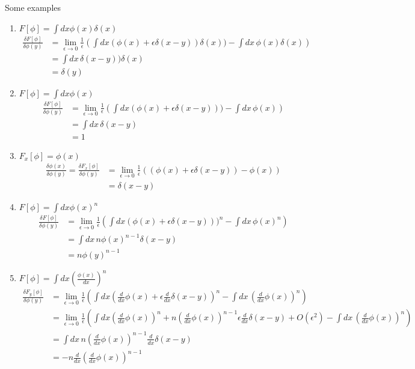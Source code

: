 \documentclass[10pt,a4paper]{book}
\theoremstyle{definition}
\begin{document}
Some examples
\begin{enumerate}
    \item $F[\phi]=\int dx \phi(x)\delta(x)$
    \begin{align}
        \frac{\delta F[\phi]}{\delta\phi(y)}
           &=\lim_{\epsilon\rightarrow0}\frac{1}{\epsilon}\left(\int dx(\phi(x)+\epsilon\delta(x-y))\delta(x))-\int
        dx\,\phi(x)\delta(x)\right)\\
        &=\int dx\,\delta(x-y))\delta(x)\\
       &=\delta(y)
    \end{align}
    \item $F[\phi]=\int dx \phi(x)$
    \begin{align}
        \frac{\delta F[\phi]}{\delta\phi(y)}
        &=\lim_{\epsilon\rightarrow0}\frac{1}{\epsilon}\left(\int dx(\phi(x)+\epsilon\delta(x-y)))-\int dx\,\phi(x)\right)\\
        &=\int dx\,\delta(x-y)\\
        &=1
    \end{align}
    \item $F_x[\phi]=\phi(x)$
    \begin{align}
        \frac{\delta \phi(x)}{\delta\phi(y)}=\frac{\delta F_x[\phi]}{\delta\phi(y)}
        &=\lim_{\epsilon\rightarrow0}\frac{1}{\epsilon}\left((\phi(x)+\epsilon\delta(x-y))-\phi(x)\right)\\
        &=\delta(x-y)
    \end{align}
    \item $F[\phi]=\int dx \phi(x)^n$
    \begin{align}
        \frac{\delta F[\phi]}{\delta\phi(y)}
        &=\lim_{\epsilon\rightarrow0}\frac{1}{\epsilon}\left(\int dx(\phi(x)+\epsilon\delta(x-y)))^n-\int dx\,\phi(x)^n\right)\\
        &=\int dx\,n\phi(x)^{n-1}\delta(x-y)\\
        &=n\phi(y)^{n-1}
    \end{align}
    \item $F[\phi]=\int dx \left(\frac{\phi(x)}{dx}\right)^n$
	\begin{align}
	\frac{\delta F_y[\phi]}{\delta\phi(y)}
	&=\lim_{\epsilon\rightarrow0}\frac{1}{\epsilon}\left(\int dx(\frac{d}{dx}\phi(x)+\epsilon\frac{d}{dx}\delta(x-y))^n-\int dx\,(\frac{d}{dx}\phi(x))^n\right)\\
	&=\lim_{\epsilon\rightarrow0}\frac{1}{\epsilon}\left(\int dx(\frac{d}{dx}\phi(x))^n+n(\frac{d}{dx}\phi(x))^{n-1}\epsilon\frac{d}{dx}\delta(x-y)+O(\epsilon^2)-\int dx\,(\frac{d}{dx}\phi(x))^n\right)\\
	&=\int dx\, n(\frac{d}{dx}\phi(x))^{n-1}\frac{d}{dx}\delta(x-y)\\
	&=- n\frac{d}{dx}(\frac{d}{dx}\phi(x))^{n-1}
	\end{align}	    
    

\end{enumerate}
\end{document}
